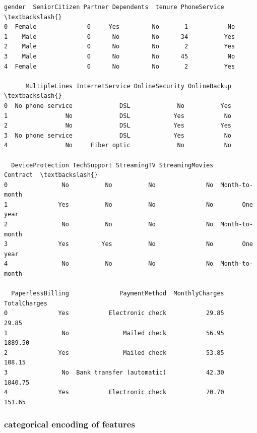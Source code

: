 \documentclass[11pt]{article}
\makeatletter
\newcommand{\boxspacing}{\kern\kvtcb@left@rule\kern\kvtcb@boxsep}
\newcommand{\prompt}[4]{
        {\ttfamily\llap{{\color{#2}[#3]:\hspace{3pt}#4}}\vspace{-\baselineskip}}
    }
\makeatother
\begin{document}
            \begin{tcolorbox}[breakable, size=fbox, boxrule=.5pt, pad at break*=1mm, opacityfill=0]
\prompt{Out}{outcolor}{289}{\boxspacing}
\begin{Verbatim}[commandchars=\\\{\}]
   gender  SeniorCitizen Partner Dependents  tenure PhoneService  \textbackslash{}
0  Female              0     Yes         No       1           No
1    Male              0      No         No      34          Yes
2    Male              0      No         No       2          Yes
3    Male              0      No         No      45           No
4  Female              0      No         No       2          Yes

      MultipleLines InternetService OnlineSecurity OnlineBackup  \textbackslash{}
0  No phone service             DSL             No          Yes
1                No             DSL            Yes           No
2                No             DSL            Yes          Yes
3  No phone service             DSL            Yes           No
4                No     Fiber optic             No           No

  DeviceProtection TechSupport StreamingTV StreamingMovies        Contract  \textbackslash{}
0               No          No          No              No  Month-to-month
1              Yes          No          No              No        One year
2               No          No          No              No  Month-to-month
3              Yes         Yes          No              No        One year
4               No          No          No              No  Month-to-month

  PaperlessBilling              PaymentMethod  MonthlyCharges  TotalCharges
0              Yes           Electronic check           29.85         29.85
1               No               Mailed check           56.95       1889.50
2              Yes               Mailed check           53.85        108.15
3               No  Bank transfer (automatic)           42.30       1840.75
4              Yes           Electronic check           70.70        151.65
\end{Verbatim}
\end{tcolorbox}
        
    \subsubsection{categorical encoding of
features}\label{categorical-encoding-of-features}
\end{document}
